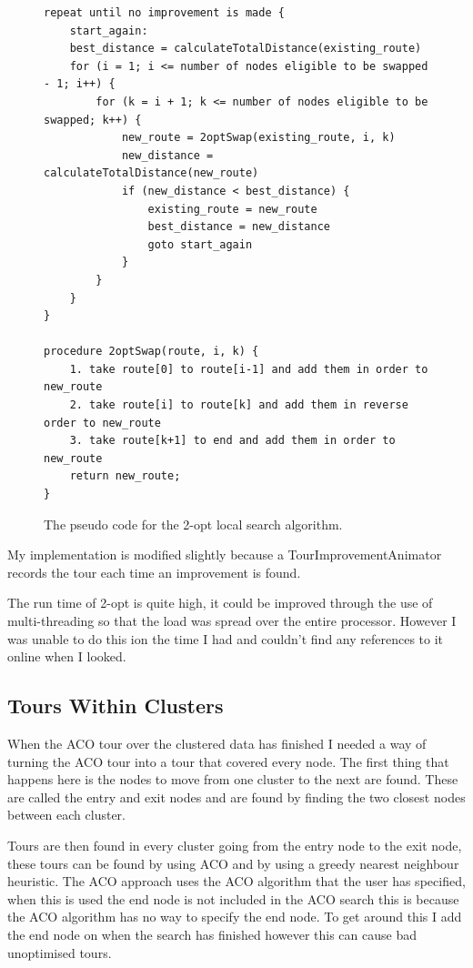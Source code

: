 \begin{figure}
\begin{verbatim}
repeat until no improvement is made {
    start_again:
    best_distance = calculateTotalDistance(existing_route)
    for (i = 1; i <= number of nodes eligible to be swapped - 1; i++) {
        for (k = i + 1; k <= number of nodes eligible to be swapped; k++) {
            new_route = 2optSwap(existing_route, i, k)
            new_distance = calculateTotalDistance(new_route)
            if (new_distance < best_distance) {
                existing_route = new_route
                best_distance = new_distance
                goto start_again
            }
        }
    }
}

procedure 2optSwap(route, i, k) {
    1. take route[0] to route[i-1] and add them in order to new_route
    2. take route[i] to route[k] and add them in reverse order to new_route
    3. take route[k+1] to end and add them in order to new_route
    return new_route;
}

\end{verbatim}
\centering
\caption{The pseudo code for the 2-opt local search algorithm.\cite{2-opt_pseudo_code}}
\label{fig:2-opt-epseudo-code}
\end{figure}

My implementation is modified slightly because a TourImprovementAnimator records the tour each time an improvement is found.

The run time of 2-opt is quite high, it could be improved through the use of multi-threading so that the load was spread over the entire processor. However I was unable to do this ion the time I had and couldn't find any references to it online when I looked.

\subsection{Tours Within Clusters}

When the ACO tour over the clustered data has finished I needed a way of turning the ACO tour into a tour that covered every node. The first thing that happens here is the nodes to move from one cluster to the next are found. These are called the entry and exit nodes and are found by finding the two closest nodes between each cluster. 

Tours are then found in every cluster going from the entry node to the exit node, these tours can be found by using ACO and by using a greedy nearest neighbour heuristic. The ACO approach uses the ACO algorithm that the user has specified, when this is used the end node is not included in the ACO search this is because the ACO algorithm has no way to specify the end node. To get around this I add the end node on when the search has finished however this can cause bad unoptimised tours.

